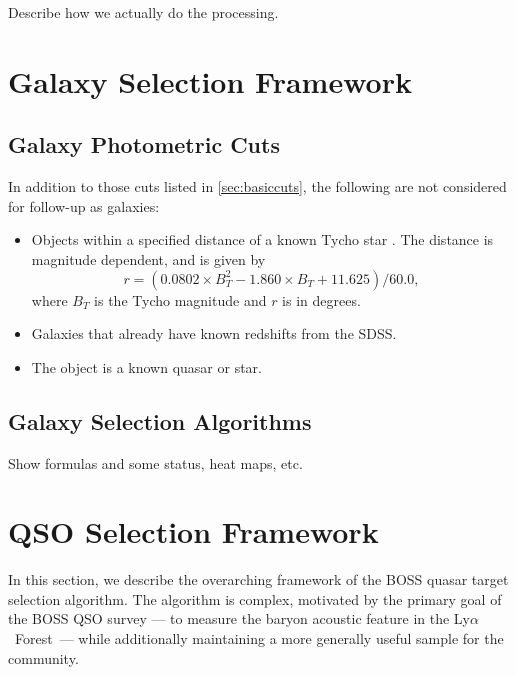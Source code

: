 \documentclass[12pt,preprint]{aastex}
\newcommand{\Lyaf}{Ly$\alpha$~Forest}
\begin{document}
Describe how we actually do the processing.

\section{Galaxy Selection Framework} \label{sec:galframe}

\subsection{Galaxy Photometric Cuts}

In addition to those cuts listed in \ref{sec:basiccuts}, the following are not
considered for follow-up as galaxies:

\begin{itemize}

    \item Objects within a specified distance of a known Tycho star
    \citep{tycho2}.  The distance is magnitude dependent, and is given 
    by
    \begin{equation}
    r = (0.0802\times B_T^2 - 1.860\times B_T + 11.625)/60.0,
    \end{equation}
    where $B_T$ is the Tycho magnitude and $r$ is in degrees.

    \item Galaxies that already have known redshifts from the SDSS.

    \item The object is a known quasar or star.

\end{itemize}

\subsection{Galaxy Selection Algorithms}

Show formulas and some status, heat maps, etc.


\section{QSO Selection Framework} \label{sec:qsoframe}

In this section, we describe the overarching framework of the BOSS
quasar target selection algorithm. The algorithm is complex, motivated
by the primary goal of the BOSS QSO survey --- to measure the baryon
acoustic feature in the \Lyaf\ --- while additionally maintaining a more
generally useful sample for the community.
\end{document}
